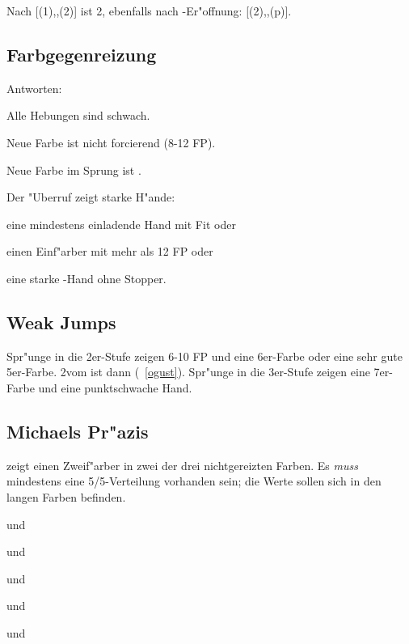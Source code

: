 Nach [(1\of){}\sep\kontra{}\sep(2\of)] ist 2\SA {}, ebenfalls
nach -Er"offnung: [(2\of){}\sep\kontra{}\sep(p)].

\subsection{Farbgegenreizung}

Antworten:
\begin{compactitem}
\item Alle Hebungen sind schwach.
\item Neue Farbe ist nicht forcierend (8-12 FP).
\item Neue Farbe im Sprung ist .
\item Der "Uberruf zeigt starke H"ande:
  \begin{compactitem}
  \item eine mindestens einladende Hand mit Fit oder
  \item einen Einf"arber mit mehr als 12 FP oder
  \item eine starke \sa-Hand ohne Stopper.
  \end{compactitem}
\end{compactitem}

\subsection{Weak Jumps}

Spr"unge in die 2er-Stufe zeigen 6-10 FP und eine 6er-Farbe oder eine sehr gute
5er-Farbe. 2\SA vom \eo ist dann  (\ra~\ref{ogust}).
Spr"unge in die 3er-Stufe zeigen eine 7\pl{}er-Farbe und eine punktschwache
Hand.

\subsection{Michaels Pr"azis}

 zeigt einen Zweif"arber in zwei der drei
nichtgereizten Farben.  Es \emph{muss} mindestens eine 5/5-Verteilung
vorhanden sein; die Werte sollen sich in den langen Farben befinden.
%
\bdsc
\item[(1\uf){}\sep2\kar] \co und \pi
\item[(1\uf){}\sep2\SA] \co und \aufa {}
\item[(1\of){}\sep2\of] \aofa und \tr
\item[(1\of){}\sep2\SA] \tr und \ka {}
\item[(1\of){}\sep3\tre] \aofa und \ka
\edsc


